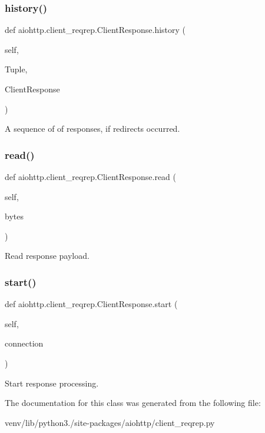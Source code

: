 \subsubsection{\texorpdfstring{history()}{history()}}
{\footnotesize\ttfamily def aiohttp.\+client\+\_\+reqrep.\+Client\+Response.\+history (\begin{DoxyParamCaption}\item[{}]{self,  }\item[{}]{Tuple,  }\item[{}]{Client\+Response }\end{DoxyParamCaption})}

\begin{DoxyVerb}A sequence of of responses, if redirects occurred.\end{DoxyVerb}
 \mbox{\label{classaiohttp_1_1client__reqrep_1_1_client_response_aba6fd4155f2908c5d79add128025ea48}} 
\subsubsection{\texorpdfstring{read()}{read()}}
{\footnotesize\ttfamily def aiohttp.\+client\+\_\+reqrep.\+Client\+Response.\+read (\begin{DoxyParamCaption}\item[{}]{self,  }\item[{}]{bytes }\end{DoxyParamCaption})}

\begin{DoxyVerb}Read response payload.\end{DoxyVerb}
 \mbox{\label{classaiohttp_1_1client__reqrep_1_1_client_response_a83d4aa95079a883fabd10d1bc1159d8a}} 
\subsubsection{\texorpdfstring{start()}{start()}}
{\footnotesize\ttfamily def aiohttp.\+client\+\_\+reqrep.\+Client\+Response.\+start (\begin{DoxyParamCaption}\item[{}]{self,  }\item[{}]{connection }\end{DoxyParamCaption})}

\begin{DoxyVerb}Start response processing.\end{DoxyVerb}
 

The documentation for this class was generated from the following file\+:\begin{DoxyCompactItemize}
\item 
venv/lib/python3./site-\/packages/aiohttp/client\+\_\+reqrep.\+py\end{DoxyCompactItemize}
